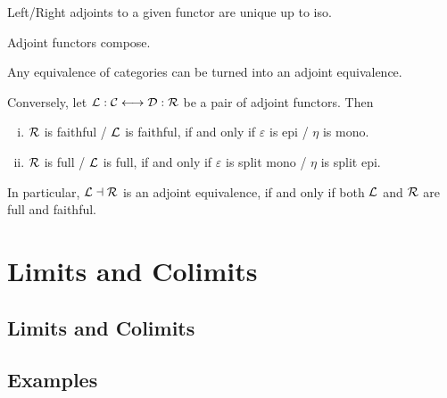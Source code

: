 	\begin{lemma}
		Left/Right adjoints to a given functor are unique up to  iso.

		Adjoint functors compose.
	\end{lemma}

	\begin{lemma}
		Any equivalence of categories can be turned into an adjoint equivalence.

		Conversely, let $\mathcal{L}: \mathcal{C} <-> \mathcal{D}: \mathcal{R}$ be a pair of adjoint functors. Then
		\begin{enumerate}[(i)]
			\item{
				$\mathcal{R}$ is faithful / $\mathcal{L}$ is faithful, if and only if $\varepsilon$ is epi / $\eta$ is mono.
			}
			\item{
				$\mathcal{R}$ is full / $\mathcal{L}$ is full, if and only if $\varepsilon$ is split mono / $\eta$ is split epi.
			}
		\end{enumerate}
		In particular, $\mathcal{L} \dashv \mathcal{R}$ is an adjoint equivalence, if and only if both $\mathcal{L}$ and $\mathcal{R}$ are full and faithful.
	\end{lemma}

	\section{Limits and Colimits}
	\subsection{Limits and Colimits}

	\begin{lemma}
	\end{lemma}

	\subsection{Examples}

